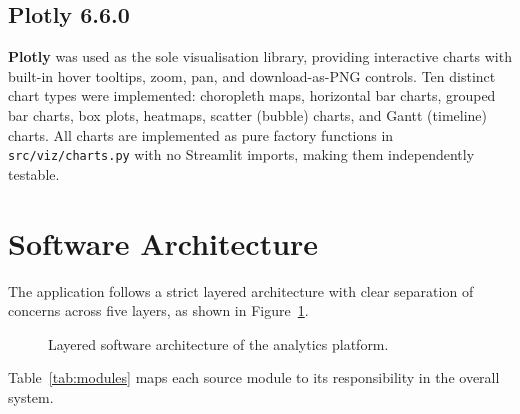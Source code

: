 \documentclass[12pt, a4paper]{report}
\begin{document}
\subsection{Plotly 6.6.0}

\textbf{Plotly} was used as the sole visualisation library, providing
interactive charts with built-in hover tooltips, zoom, pan, and
download-as-PNG controls. Ten distinct chart types were implemented:
choropleth maps, horizontal bar charts, grouped bar charts, box plots,
heatmaps, scatter (bubble) charts, and Gantt (timeline) charts. All charts
are implemented as pure factory functions in \texttt{src/viz/charts.py}
with no Streamlit imports, making them independently testable.

\section{Software Architecture}

The application follows a strict layered architecture with clear separation
of concerns across five layers, as shown in Figure~\ref{fig:arch}.

\begin{figure}[H]
  \centering
  \caption{Layered software architecture of the analytics platform.}
  \label{fig:arch}
\end{figure}

Table~\ref{tab:modules} maps each source module to its responsibility in
the overall system.
\end{document}
